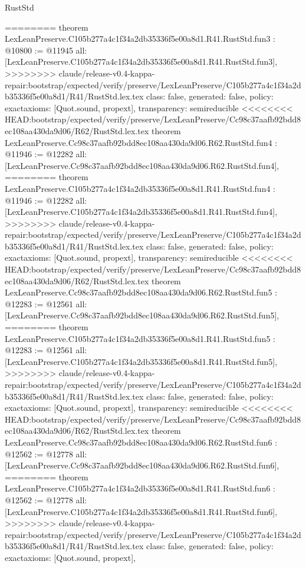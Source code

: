 \begin{lexlean}{RustStd}
\begin{coremodule}
{\begin{coremodule}
{{{{{{========
theorem LexLeanPreserve.C105b277a4c1f34a2db35336f5e00a8d1.R41.RustStd.fun3 : @10800 := @11945 {
  all: [LexLeanPreserve.C105b277a4c1f34a2db35336f5e00a8d1.R41.RustStd.fun3],
>>>>>>>> claude/release-v0.4-kappa-repair:bootstrap/expected/verify/preserve/LexLeanPreserve/C105b277a4c1f34a2db35336f5e00a8d1/R41/RustStd.lex.tex
  class: false,
  generated: false,
  policy: exact{axioms: [Quot.sound, propext]},
  transparency: semireducible
}
<<<<<<<< HEAD:bootstrap/expected/verify/preserve/LexLeanPreserve/Cc98c37aafb92bdd8ec108aa430da9d06/R62/RustStd.lex.tex
theorem LexLeanPreserve.Cc98c37aafb92bdd8ec108aa430da9d06.R62.RustStd.fun4 : @11946 := @12282 {
  all: [LexLeanPreserve.Cc98c37aafb92bdd8ec108aa430da9d06.R62.RustStd.fun4],
========
theorem LexLeanPreserve.C105b277a4c1f34a2db35336f5e00a8d1.R41.RustStd.fun4 : @11946 := @12282 {
  all: [LexLeanPreserve.C105b277a4c1f34a2db35336f5e00a8d1.R41.RustStd.fun4],
>>>>>>>> claude/release-v0.4-kappa-repair:bootstrap/expected/verify/preserve/LexLeanPreserve/C105b277a4c1f34a2db35336f5e00a8d1/R41/RustStd.lex.tex
  class: false,
  generated: false,
  policy: exact{axioms: [Quot.sound, propext]},
  transparency: semireducible
}
<<<<<<<< HEAD:bootstrap/expected/verify/preserve/LexLeanPreserve/Cc98c37aafb92bdd8ec108aa430da9d06/R62/RustStd.lex.tex
theorem LexLeanPreserve.Cc98c37aafb92bdd8ec108aa430da9d06.R62.RustStd.fun5 : @12283 := @12561 {
  all: [LexLeanPreserve.Cc98c37aafb92bdd8ec108aa430da9d06.R62.RustStd.fun5],
========
theorem LexLeanPreserve.C105b277a4c1f34a2db35336f5e00a8d1.R41.RustStd.fun5 : @12283 := @12561 {
  all: [LexLeanPreserve.C105b277a4c1f34a2db35336f5e00a8d1.R41.RustStd.fun5],
>>>>>>>> claude/release-v0.4-kappa-repair:bootstrap/expected/verify/preserve/LexLeanPreserve/C105b277a4c1f34a2db35336f5e00a8d1/R41/RustStd.lex.tex
  class: false,
  generated: false,
  policy: exact{axioms: [Quot.sound, propext]},
  transparency: semireducible
}
<<<<<<<< HEAD:bootstrap/expected/verify/preserve/LexLeanPreserve/Cc98c37aafb92bdd8ec108aa430da9d06/R62/RustStd.lex.tex
theorem LexLeanPreserve.Cc98c37aafb92bdd8ec108aa430da9d06.R62.RustStd.fun6 : @12562 := @12778 {
  all: [LexLeanPreserve.Cc98c37aafb92bdd8ec108aa430da9d06.R62.RustStd.fun6],
========
theorem LexLeanPreserve.C105b277a4c1f34a2db35336f5e00a8d1.R41.RustStd.fun6 : @12562 := @12778 {
  all: [LexLeanPreserve.C105b277a4c1f34a2db35336f5e00a8d1.R41.RustStd.fun6],
>>>>>>>> claude/release-v0.4-kappa-repair:bootstrap/expected/verify/preserve/LexLeanPreserve/C105b277a4c1f34a2db35336f5e00a8d1/R41/RustStd.lex.tex
  class: false,
  generated: false,
  policy: exact{axioms: [Quot.sound, propext]},
}}}}}}}}}}
\end{coremodule}}
\end{coremodule}
\end{lexlean}
